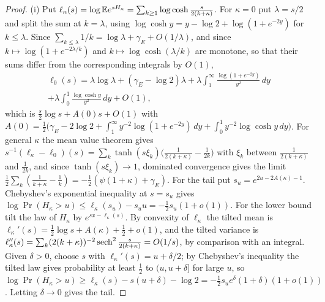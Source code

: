 \begin{proof}
(i) Put $\ell_\kappa(s)=\log\mathbb{E} e^{s H_\kappa}=\sum_{k\ge1}\log\cosh\frac{s}{2(k+\kappa)}$. For $\kappa=0$ put $\lambda=s/2$ and split the sum at $k=\lambda$, using $\log\cosh y=y-\log2+\log(1+e^{-2y})$ for $k\le\lambda$. Since $\sum_{k\le\lambda}1/k=\log\lambda+\gamma_E+O(1/\lambda)$, and since $k\mapsto\log(1+e^{-2\lambda/k})$ and $k\mapsto\log\cosh(\lambda/k)$ are monotone, so that their sums differ from the corresponding integrals by $O(1)$,
\begin{multline*}
\ell_0(s)=\lambda\log\lambda+(\gamma_E-\log2)\lambda+\lambda\int_1^\infty\frac{\log(1+e^{-2y})}{y^2}\,dy\\
+\lambda\int_0^1\frac{\log\cosh y}{y^2}\,dy+O(1),
\end{multline*}
which is $\frac s2\log s+A(0)s+O(1)$ with $A(0)=\frac12\bigl(\gamma_E-2\log2+\int_1^\infty y^{-2}\log(1+e^{-2y})\,dy+\int_0^1y^{-2}\log\cosh y\,dy\bigr)$. For general $\kappa$ the mean value theorem gives $s^{-1}(\ell_\kappa-\ell_0)(s)=\sum_k\tanh(s\xi_k)\bigl(\frac1{2(k+\kappa)}-\frac1{2k}\bigr)$ with $\xi_k$ between $\frac1{2(k+\kappa)}$ and $\frac1{2k}$, and since $\tanh(s\xi_k)\to1$, dominated convergence gives the limit $\frac12\sum_k(\frac1{k+\kappa}-\frac1k)=-\frac12(\psi(1+\kappa)+\gamma_E)$. For the tail put $s_u=e^{2u-2A(\kappa)-1}$. Chebyshev's exponential inequality at $s=s_u$ gives $\log\Pr(H_\kappa>u)\le\ell_\kappa(s_u)-s_uu=-\frac12s_u(1+o(1))$. For the lower bound tilt the law of $H_\kappa$ by $e^{s x-\ell_\kappa(s)}$. By convexity of $\ell_\kappa$ the tilted mean is $\ell_\kappa'(s)=\frac12\log s+A(\kappa)+\frac12+o(1)$, and the tilted variance is $\ell_\kappa''(s)=\sum_k(2(k+\kappa))^{-2}\operatorname{sech}^2\frac{s}{2(k+\kappa)}=O(1/s)$, by comparison with an integral. Given $\delta>0$, choose $s$ with $\ell_\kappa'(s)=u+\delta/2$; by Chebyshev's inequality the tilted law gives probability at least $\frac12$ to $(u,u+\delta]$ for large $u$, so $\log\Pr(H_\kappa>u)\ge\ell_\kappa(s)-s(u+\delta)-\log2=-\frac12s_ue^{\delta}(1+\delta)(1+o(1))$. Letting $\delta\to0$ gives the tail.


\end{proof}
